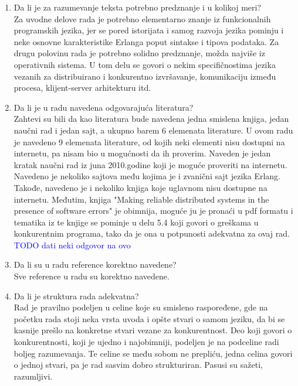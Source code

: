 \documentclass[a4paper]{report}
\newcommand{\odgovor}[1]{\textcolor{blue}{#1}}
\begin{document}
\begin{enumerate}
\item Da li je za razumevanje teksta potrebno predznanje i u kolikoj meri?\\
Za uvodne delove rada je potrebno elementarno znanje iz funkcionalnih programskih jezika, jer se pored istorijata i samog razvoja jezika pominju i neke osnovne karakteristike Erlanga poput sintakse i tipova podataka. Za drugu polovinu rada je potrebno solidno predznanje, možda najviše iz operativnih sistema. U tom delu se govori o nekim specifičnostima jezika vezanih za distribuirano i konkurentno izvršavanje, komunikaciju između procesa, klijent-server arhitekturu itd.


\item Da li je u radu navedena odgovarajuća literatura?\\
Zahtevi su bili da kao literatura bude navedena jedna smislena knjiga, jedan naučni rad i jedan sajt, a ukupno barem 6 elemenata literature. U ovom radu je navedeno 9 elemenata literature, od kojih neki elementi nisu dostupni na internetu, pa nisam bio u mogućnosti da ih proverim. Naveden je jedan kratak naučni rad iz juna 2010.godine koji je moguće proveriti na internetu. Navedeno je nekoliko sajtova među kojima je i zvanični sajt jezika Erlang. Takođe, navedeno je i nekoliko knjiga koje uglavnom nisu dostupne na internetu. Međutim, knjiga "Making reliable distributed systems in the presence of software errors" je obimnija, moguće ju je pronaći u pdf formatu i tematika iz te knjige se pominje u delu 5.4 koji govori o greškama u konkurentnim programa, tako da je ona u potpunosti adekvatna za ovaj rad.\\

\odgovor{TODO dati neki odgovor na ovo}

\item Da li su u radu reference korektno navedene?\\
Sve reference u radu su korektno navedene. 


\item Da li je struktura rada adekvatna?\\
Rad je pravilno podeljen u celine koje su smisleno raspoređene, gde na početku rada stoji neka vrsta uvoda i opšte stvari o samom jeziku, da bi se kasnije prešlo na konkretne stvari vezane za konkurentnost. Deo koji govori o konkurentnosti, koji je ujedno i najobimniji, podeljen je na podceline radi boljeg razumevanja. Te celine se među sobom ne prepliću, jedna celina govori o jednoj stvari, pa je rad sasvim dobro strukturiran. Pasusi su sažeti, razumljivi. 



\end{enumerate}
\end{document}

